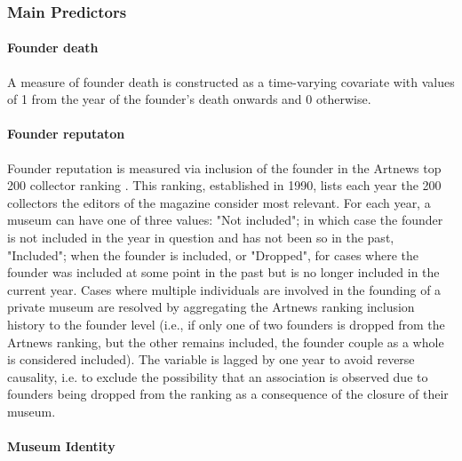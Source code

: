 \documentclass[12pt]{article}
\begin{document}
\subsubsection*{Main Predictors}


\paragraph*{Founder death}

A measure of founder death is constructed as a time-varying covariate with values of 1 from the year of the founder's death onwards and 0 otherwise.
\paragraph*{Founder reputaton}


Founder reputation is measured via inclusion of the founder in the Artnews top 200 collector ranking \parencite{Artnews_ranking}.
This ranking, established in 1990, lists each year the 200 collectors the editors of the magazine consider most relevant.
For each year, a museum can have one of three values: "Not included"; in which case the founder is not included in the year in question and has not been so in the past, "Included"; when the founder is included, or "Dropped", for cases where the founder was included at some point in the past but is no longer included in the current year.
Cases where multiple individuals are involved in the founding of a private museum are resolved by aggregating the Artnews ranking inclusion history to the founder level (i.e., if only one of two founders is dropped from the Artnews ranking, but the other remains included, the founder couple as a whole is considered included).
The variable is lagged by one year to avoid reverse causality, i.e. to exclude the possibility that an association is observed due to founders being dropped from the ranking as a consequence of the closure of their museum.
\paragraph*{Museum Identity}
\end{document}
